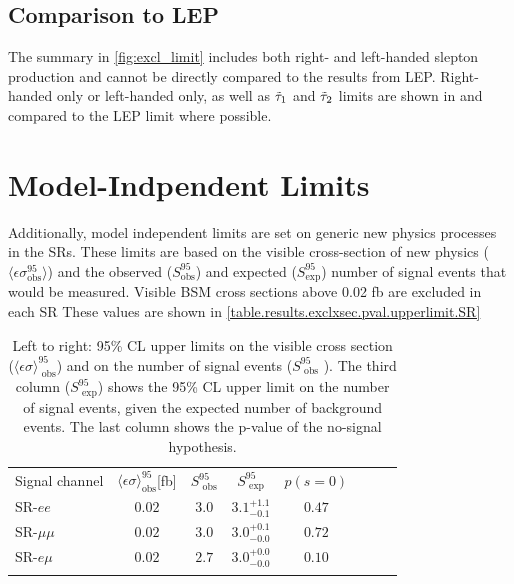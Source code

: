 \subsection{Comparison to LEP}

The summary in \autoref{fig:excl_limit} includes both right- and left-handed slepton production and cannot be directly compared to the results from \ac{LEP}. Right-handed only or left-handed only, as well as $\tilde{\tau}_1$ and $\tilde{\tau}_2$ limits are shown in  and compared to the LEP limit where possible.


\FloatBarrier

\section{Model-Indpendent Limits}
Additionally, model independent limits are set on generic new physics processes in the \acp{SR}. These limits are based on the visible cross-section of new physics ($\langle \epsilon \sigma^{95}_{\text{obs}} \rangle$) and the observed ($S^{95}_{\text{obs}}$) and expected ($S^{95}_{\text{exp}}$) number of signal events that would be measured. Visible \ac{BSM} cross sections above 0.02 fb are excluded in each \ac{SR} These values are shown in \autoref{table.results.exclxsec.pval.upperlimit.SR}

\begin{table}
\centering
\begin{tabular*}{\textwidth}{@{\extracolsep{\fill}}lccccccc}
\noalign{\smallskip}\noalign{\smallskip}
{ Signal channel} & $\langle\epsilon{ \sigma}\rangle_\text{obs}^{95}$[fb]  &  $S_\text{ obs}^{95}$  & $S_\text{ exp}^{95}$  & $p(s=0)$ 
\\
\noalign{\smallskip}\hline\noalign{\smallskip}
 SR-$ee$   & $0.02$ &  $3.0$ & $ { 3.1 }^{ +1.1 }_{ -0.1 }$ &  $ 0.47$ \\%
 SR-$\mu\mu$   &$0.02$ &  $3.0$ & $ { 3.0 }^{ +0.1 }_{ -0.0 }$ & $ 0.72$ \\%
SR-$e\mu$   &$0.02$ &  $2.7$ & $ { 3.0 }^{ +0.0 }_{ -0.0 }$ & $ 0.10$ \\%
\noalign{\smallskip}\hline\noalign{\smallskip}
\end{tabular*}
\caption[Breakdown of upper limits.]{
Left to right: 95\% CL upper limits on the visible cross section
($\langle\epsilon\sigma\rangle_\text{ obs}^{95}$) and on the number of
signal events ($S_\text{ obs}^{95}$ ).  The third column
($S_\text{ exp}^{95}$) shows the 95\% CL upper limit on the number of
signal events, given the expected number of background events. The last column shows the p-value of the no-signal hypothesis.
\label{table.results.exclxsec.pval.upperlimit.SR}}
\end{table}